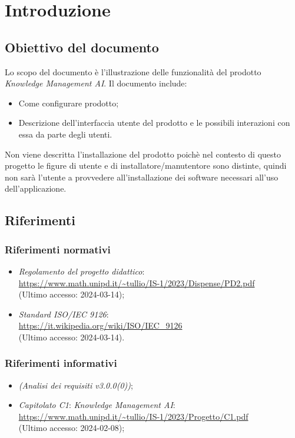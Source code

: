 \documentclass[10pt, a4paper]{article}
\title{\titolo}
\author{SWEetCode}
\begin{document}



\newpage

\tableofcontents
\newpage

\listoffigures
\newpage
\section{Introduzione}
\subsection{Obiettivo del documento}
Lo scopo del documento è l'illustrazione delle funzionalità del prodotto \textit{Knowledge Management AI}. Il documento include: 
\begin{itemize}
    \item Come configurare prodotto;
    \item Descrizione dell'interfaccia utente del prodotto e le possibili interazioni con essa da parte degli utenti.
\end{itemize} 
Non viene descritta l'installazione del prodotto poichè nel contesto di questo progetto le figure di utente e di installatore/manutentore sono distinte, quindi non sarà l'utente a provvedere all'installazione dei software necessari all'uso dell'applicazione.


\subsection{Riferimenti}
\subsubsection{Riferimenti normativi}
\begin{itemize}
    \item \textit{Regolamento del progetto didattico}: \\
        \url{https://www.math.unipd.it/~tullio/IS-1/2023/Dispense/PD2.pdf}\\
        (Ultimo accesso: 2024-03-14);
    \item \textit{Standard ISO/IEC 9126}:\\
        \url{https://it.wikipedia.org/wiki/ISO/IEC_9126}\\
        (Ultimo accesso: 2024-03-14).
    \end{itemize}
\subsubsection{Riferimenti informativi}
\begin{itemize}
        \item \textit{(Analisi dei requisiti v3.0.0(0))};
        \item \textit{Capitolato C1}: \textit{Knowledge Management AI}: \\ \url{https://www.math.unipd.it/~tullio/IS-1/2023/Progetto/C1.pdf}\\
        (Ultimo accesso: 2024-02-08);
   
        \end{itemize}
\end{document}
